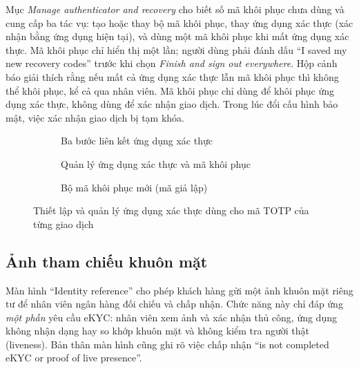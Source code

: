 Mục \textit{Manage authenticator and recovery} cho biết số mã khôi phục chưa dùng và cung cấp ba tác vụ: tạo hoặc thay bộ mã khôi phục, thay ứng dụng xác thực (xác nhận bằng ứng dụng hiện tại), và dùng một mã khôi phục khi mất ứng dụng xác thực. Mã khôi phục chỉ hiển thị một lần; người dùng phải đánh dấu ``I saved my new recovery codes'' trước khi chọn \textit{Finish and sign out everywhere}. Hộp cảnh báo giải thích rằng nếu mất cả ứng dụng xác thực lẫn mã khôi phục thì không thể khôi phục, kể cả qua nhân viên. Mã khôi phục chỉ dùng để khôi phục ứng dụng xác thực, không dùng để xác nhận giao dịch. Trong lúc đổi cấu hình bảo mật, việc xác nhận giao dịch bị tạm khóa.

\begin{figure}[H]
\centering
\begin{subfigure}[t]{0.31\textwidth}
  \centering
  \caption{Ba bước liên kết ứng dụng xác thực}
  \label{fig:ch4-security-setup}
\end{subfigure}\hfill
\begin{subfigure}[t]{0.31\textwidth}
  \centering
  \caption{Quản lý ứng dụng xác thực và mã khôi phục}
  \label{fig:ch4-security-manage}
\end{subfigure}\hfill
\begin{subfigure}[t]{0.31\textwidth}
  \centering
  \caption{Bộ mã khôi phục mới (mã giả lập)}
  \label{fig:ch4-security-codes}
\end{subfigure}
\caption{Thiết lập và quản lý ứng dụng xác thực dùng cho mã TOTP của từng giao dịch}
\label{fig:ch4-security}
\end{figure}

\subsection{Ảnh tham chiếu khuôn mặt}
\label{sec:ch4-reference}

Màn hình ``Identity reference'' cho phép khách hàng gửi một ảnh khuôn mặt riêng tư để nhân viên ngân hàng đối chiếu và chấp nhận. Chức năng này chỉ đáp ứng \emph{một phần} yêu cầu eKYC: nhân viên xem ảnh và xác nhận thủ công, ứng dụng không nhận dạng hay so khớp khuôn mặt và không kiểm tra người thật (liveness). Bản thân màn hình cũng ghi rõ việc chấp nhận ``is not completed eKYC or proof of live presence''.

